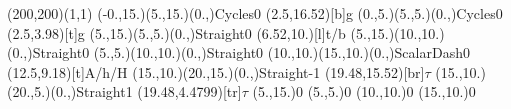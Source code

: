 \documentclass[12pt]{article}
\begin{document}
 
 \thispagestyle{empty}

\begin{feynartspicture}(200,200)(1,1)
\FADiagram{}
\FAProp(-0.,15.)(5.,15.)(0.,){Cycles}{0}
\FALabel(2.5,16.52)[b]{g}
\FAProp(0.,5.)(5.,5.)(0.,){Cycles}{0}
\FALabel(2.5,3.98)[t]{g}
\FAProp(5.,15.)(5.,5.)(0.,){Straight}{0}
\FALabel(6.52,10.)[l]{t/b}
\FAProp(5.,15.)(10.,10.)(0.,){Straight}{0}
\FAProp(5.,5.)(10.,10.)(0.,){Straight}{0}
\FAProp(10.,10.)(15.,10.)(0.,){ScalarDash}{0}
\FALabel(12.5,9.18)[t]{A/h/H}
\FAProp(15.,10.)(20.,15.)(0.,){Straight}{-1}
\FALabel(19.48,15.52)[br]{$\tau$}
\FAProp(15.,10.)(20.,5.)(0.,){Straight}{1}
\FALabel(19.48,4.4799)[tr]{$\tau$}
\FAVert(5.,15.){0}
\FAVert(5.,5.){0}
\FAVert(10.,10.){0}
\FAVert(15.,10.){0}
 \end{feynartspicture} 
 
\end{document}
